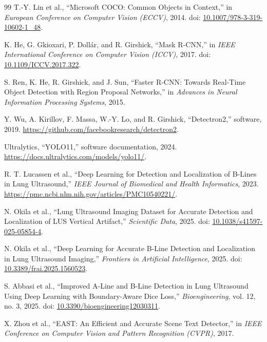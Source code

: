 \documentclass[11pt]{article}
\begin{document}
\begin{thebibliography}{99}
T.-Y. Lin et al., ``Microsoft COCO: Common Objects in Context,'' in
\textit{European Conference on Computer Vision (ECCV)}, 2014.
doi: \href{https://doi.org/10.1007/978-3-319-10602-1_48}{10.1007/978-3-319-10602-1\_48}.

K. He, G. Gkioxari, P. Doll\'ar, and R. Girshick, ``Mask R-CNN,'' in
\textit{IEEE International Conference on Computer Vision (ICCV)}, 2017.
doi: \href{https://doi.org/10.1109/ICCV.2017.322}{10.1109/ICCV.2017.322}.

S. Ren, K. He, R. Girshick, and J. Sun, ``Faster R-CNN: Towards Real-Time Object
Detection with Region Proposal Networks,'' in \textit{Advances in Neural
Information Processing Systems}, 2015.

Y. Wu, A. Kirillov, F. Massa, W.-Y. Lo, and R. Girshick, ``Detectron2,'' software,
2019. \url{https://github.com/facebookresearch/detectron2}.

Ultralytics, ``YOLO11,'' software documentation, 2024.
\url{https://docs.ultralytics.com/models/yolo11/}.

R. T. Lucassen et al., ``Deep Learning for Detection and Localization of B-Lines
in Lung Ultrasound,'' \textit{IEEE Journal of Biomedical and Health Informatics},
2023. \url{https://pmc.ncbi.nlm.nih.gov/articles/PMC10540221/}.

N. Okila et al., ``Lung Ultrasound Imaging Dataset for Accurate Detection
and Localization of LUS Vertical Artifact,'' \textit{Scientific Data}, 2025.
doi: \href{https://doi.org/10.1038/s41597-025-05854-4}{10.1038/s41597-025-05854-4}.

N. Okila et al., ``Deep Learning for Accurate B-Line Detection and
Localization in Lung Ultrasound Imaging,'' \textit{Frontiers in Artificial
Intelligence}, 2025. doi:
\href{https://doi.org/10.3389/frai.2025.1560523}{10.3389/frai.2025.1560523}.

S. Abbasi et al., ``Improved A-Line and B-Line Detection in Lung Ultrasound Using
Deep Learning with Boundary-Aware Dice Loss,'' \textit{Bioengineering}, vol. 12,
no. 3, 2025. doi:
\href{https://doi.org/10.3390/bioengineering12030311}{10.3390/bioengineering12030311}.

X. Zhou et al., ``EAST: An Efficient and Accurate Scene Text Detector,'' in
\textit{IEEE Conference on Computer Vision and Pattern Recognition (CVPR)}, 2017.


\end{thebibliography}
\end{document}

